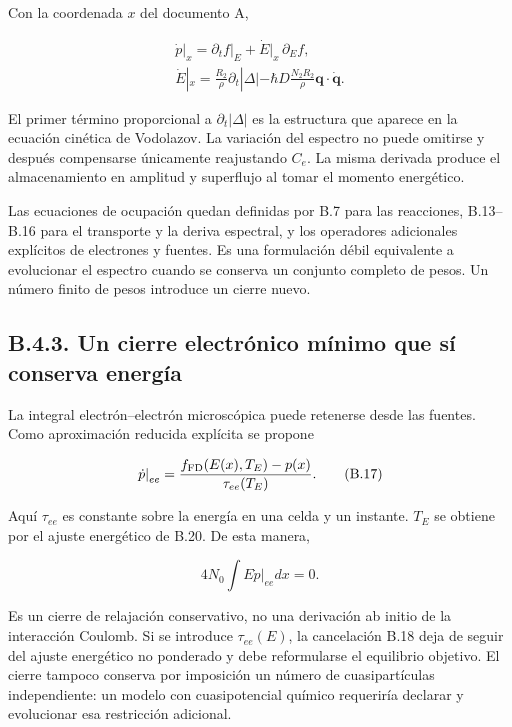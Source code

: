 \documentclass[
  spanish,
  10pt,
  a4paper,
]{article}
\begin{document}
Con la coordenada \(x\) del documento A,

\[
\begin{gathered}
\left.\dot p\right|_x=
\left.\partial_tf\right|_E+\dot E|_x\,\partial_Ef,\\
\dot E|_x=\frac{R_2}{\rho}\partial_t|\Delta|
-\hbar D\frac{N_2R_2}{\rho}\mathbf q\cdot\dot{\mathbf q}.
\end{gathered} \tag{B.16}
\]

El primer término proporcional a \(\partial_t|\Delta|\) es la estructura
que aparece en la ecuación cinética de Vodolazov. La variación del
espectro no puede omitirse y después compensarse únicamente reajustando
\(C_e\). La misma derivada produce el almacenamiento en amplitud y
superflujo al tomar el momento energético.

Las ecuaciones de ocupación quedan definidas por B.7 para las
reacciones, B.13--B.16 para el transporte y la deriva espectral, y los
operadores adicionales explícitos de electrones y fuentes. Es una
formulación débil equivalente a evolucionar el espectro cuando se
conserva un conjunto completo de pesos. Un número finito de pesos
introduce un cierre nuevo.

\subsection{B.4.3. Un cierre electrónico mínimo que sí conserva
energía}\label{b.4.3.-un-cierre-electruxf3nico-muxednimo-que-suxed-conserva-energuxeda}

La integral electrón--electrón microscópica puede retenerse desde las
fuentes. Como aproximación reducida explícita se propone

\[
\left.\dot p\right|_{ee}
=\frac{f_{\rm FD}(E(x),T_E)-p(x)}{\tau_{ee}(T_E)}. \tag{B.17}
\]

Aquí \(\tau_{ee}\) es constante sobre la energía en una celda y un
instante. \(T_E\) se obtiene por el ajuste energético de B.20. De esta
manera,

\[
4N_0\int E\left.\dot p\right|_{ee}dx=0. \tag{B.18}
\]

Es un cierre de relajación conservativo, no una derivación ab initio de
la interacción Coulomb. Si se introduce \(\tau_{ee}(E)\), la cancelación
B.18 deja de seguir del ajuste energético no ponderado y debe
reformularse el equilibrio objetivo. El cierre tampoco conserva por
imposición un número de cuasipartículas independiente: un modelo con
cuasipotencial químico requeriría declarar y evolucionar esa restricción
adicional.
\end{document}
